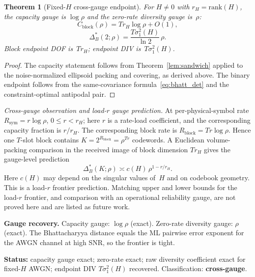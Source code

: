 \documentclass[lettersize,onecolumn]{IEEEtran}
\newtheorem{theorem}{Theorem}
\newcommand{\snr}{\rho}
\begin{document}
\begin{theorem}[Fixed-$H$ cross-gauge endpoint]\label{thm:fixed_H}
For $H \ne 0$ with $r_H = \mathrm{rank}(H)$, the capacity gauge is
$\log\snr$ and the zero-rate diversity gauge is~$\snr$:
\begin{equation}\label{eq:fixedH_capacity}
C_{\mathrm{block}}(\snr) = Tr_H\log\snr + O(1),
\end{equation}
\begin{equation}\label{eq:fixedH_binary}
\Delta_B^*(2;\snr) = \frac{T\sigma_1^2(H)}{\ln 2}\,\snr.
\end{equation}
Block endpoint DOF is~$Tr_H$; endpoint DIV is~$T\sigma_1^2(H)$.
\end{theorem}
\begin{proof}
The capacity statement follows from Theorem~\ref{lem:sandwich}
applied to the noise-normalized ellipsoid packing
and covering, as derived above.
The binary endpoint follows from
the same-covariance formula~\eqref{eq:bhatt_det} and the
constraint-optimal antipodal pair.
\end{proof}

\emph{Cross-gauge observation and load-$r$ gauge prediction.}
At per-physical-symbol rate $R_{\mathrm{sym}} = r\log\snr$,
$0 \le r < r_H$; here $r$ is a rate-load coefficient, and the
corresponding capacity fraction is $r/r_H$.
The corresponding block rate is
$R_{\mathrm{block}} = Tr\log\snr$. Hence one $T$-slot block contains
$K = 2^{R_{\mathrm{block}}} = \snr^{Tr}$ codewords. A Euclidean
volume-packing comparison in the received image of block dimension
$Tr_H$ gives the gauge-level prediction
\begin{equation}\label{eq:det_frontier}
\Delta_B^*(K;\snr) \asymp c(H)\,\snr^{1-r/r_H}.
\end{equation}
Here $c(H)$ may depend on the singular values of~$H$ and on
codebook geometry. This is a load-$r$ frontier prediction. Matching upper and
lower bounds for the load-$r$ frontier, and comparison with an
operational reliability gauge, are not proved here and are listed as
future work.

\textbf{Gauge recovery.}
Capacity gauge: $\log\snr$ (exact). Zero-rate diversity gauge:
$\snr$ (exact). The Bhattacharyya distance equals the ML pairwise
error exponent for the AWGN channel at high SNR, so the frontier is
tight.

\textbf{Status:} capacity gauge exact; zero-rate exact; raw
diversity coefficient exact for fixed-$H$ AWGN;
endpoint DIV $T\sigma_1^2(H)$ recovered.
Classification: \textbf{cross-gauge}.
\end{document}
